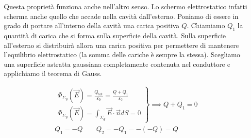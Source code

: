 \begin{figure}[htpb]
\end{figure}
\FloatBarrier

Questa proprietà funziona anche nell'altro senso. Lo schermo elettrostatico infatti scherma anche quello che accade nella cavità dall'esterno. Poniamo di essere in grado di portare all'interno della cavità una carica positiva $Q$. Chiamiamo $Q_1$ la quantità di carica che si forma sulla superficie della cavità. Sulla superficie all'esterno si distribuirà allora una carica positiva per permettere di mantenere l'equilibrio elettrostatico (la somma delle cariche è sempre la stessa). Scegliamo una superficie astratta gaussiana completamente contenuta nel conduttore e applichiamo il teorema di Gauss.

\begin{gather*}
	\left. \begin{array}{r}
	  	\Phi_{\Sigma_g}(\vec{E} ) = \frac{Q_{\text{tot}}}{\varepsilon_0} = \frac{Q+Q_1}{\varepsilon_0} \\
		\Phi_{\Sigma_g}(\vec{E} ) = \int_{\Sigma_g}\vec{E} \cdot \vec{n} dS = 0
	 \end{array} \right\} \implies Q + Q_1 = 0 \\
	 Q_1 = -Q \qquad Q_2 = -Q_1 = -(-Q) = Q
\end{gather*}

